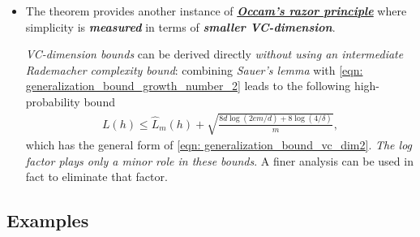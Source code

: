\documentclass[11pt]{article}
\begin{document}
\begin{itemize}
\item \begin{remark}
The theorem provides another instance of \underline{\emph{\textbf{Occam's razor principle}}} where simplicity is \emph{\textbf{measured}} in terms of \emph{\textbf{smaller VC-dimension}}.

\emph{VC-dimension bounds} can be derived directly \emph{without using an intermediate Rademacher complexity bound}: combining \emph{Sauer’s lemma} with \eqref{eqn: generalization_bound_growth_number_2} leads to the following high-probability bound
\begin{align}
L(h) \le \widehat{L}_{m}(h) + \sqrt{\frac{8d\log(2em /d) + 8\log(4/\delta)}{m}},  \label{eqn: generalization_bound_vc_dim3}
\end{align}
which has the general form of \eqref{eqn: generalization_bound_vc_dim2}. \emph{The log factor plays only a minor role in these bounds}. A finer analysis can be used in fact to eliminate that factor.
\end{remark}

\end{itemize}

\subsection{Examples}
\end{document}
